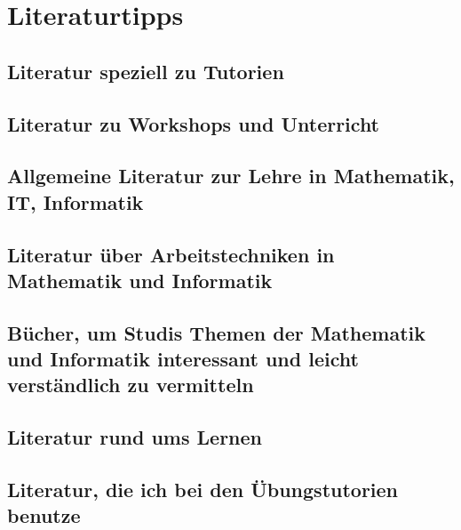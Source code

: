 \documentclass[a4paper,openany,twoside,titlepage,10pt,headsepline]{scrbook}
\begin{document}
    

    \backmatter


    \chapter{Literaturtipps}


    \section{Literatur speziell zu Tutorien}
    \cite{tutorenschulung-kassel, fackel-oder-funzel, torch-or-firehose-eggert, torch-or-firehose, tutor-leitfaden}


    \section{Literatur zu Workshops und Unterricht}
    \cite{moderationstechniken, visualisieren-praesentieren-moderieren, workshop-buch, treibhaeuser-der-zukunft}


    \section{Allgemeine Literatur zur Lehre in Mathematik, IT, Informatik}
    \cite{teaching-engineering, red-pen, it-trainer}


    \section{Literatur über Arbeitstechniken in Mathematik und Informatik}
    \cite{obda, schule-des-denkens, solve-it, prove-it}


    \section{Bücher, um Studis Themen der Mathematik und Informatik interessant und leicht verständlich zu vermitteln}
    \cite{mathe-humor, ideen-der-informatik, mathe-westentasche, in-mathe-war-ich-immer-schlecht}


    \section{Literatur rund ums Lernen}
    \cite{denken-lernen-vergessen, lernen-zu-lernen}


    \section{Literatur, die ich bei den Übungstutorien benutze}
    \cite{algorithms}

    

    
\end{document}
